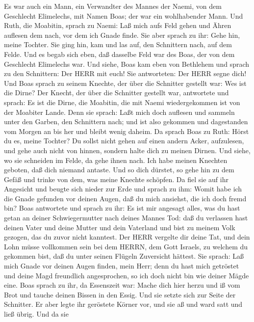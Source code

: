  Es war auch ein Mann, ein Verwandter des Mannes der Naemi,
von dem Geschlecht Elimelechs, mit Namen Boas; der war ein wohlhabender
Mann.  Und Ruth, die Moabitin, sprach zu Naemi: Laß mich
aufs Feld gehen und Ähren auflesen dem nach, vor dem ich Gnade finde.
Sie aber sprach zu ihr: Gehe hin, meine Tochter.  Sie ging
hin, kam und las auf, den Schnittern nach, auf dem Felde. Und es begab
sich eben, daß dasselbe Feld war des Boas, der von dem Geschlecht
Elimelechs war.  Und siehe, Boas kam eben von Bethlehem und
sprach zu den Schnittern: Der HERR mit euch! Sie antworteten: Der HERR
segne dich!  Und Boas sprach zu seinem Knechte, der über die
Schnitter gestellt war: Wes ist die Dirne?  Der Knecht, der
über die Schnitter gestellt war, antwortete und sprach: Es ist die
Dirne, die Moabitin, die mit Naemi wiedergekommen ist von der Moabiter
Lande.  Denn sie sprach: Laßt mich doch auflesen und sammeln
unter den Garben, den Schnittern nach; und ist also gekommen und
dagestanden vom Morgen an bis her und bleibt wenig daheim. 
Da sprach Boas zu Ruth: Hörst du es, meine Tochter? Du sollst nicht
gehen auf einen andern Acker, aufzulesen, und gehe auch nicht von
hinnen, sondern halte dich zu meinen Dirnen.  Und siehe, wo
sie schneiden im Felde, da gehe ihnen nach. Ich habe meinen Knechten
geboten, daß dich niemand antaste. Und so dich dürstet, so gehe hin zu
dem Gefäß und trinke von dem, was meine Knechte schöpfen. 
Da fiel sie auf ihr Angesicht und beugte sich nieder zur Erde und sprach
zu ihm: Womit habe ich die Gnade gefunden vor deinen Augen, daß du mich
ansiehst, die ich doch fremd bin?  Boas antwortete und
sprach zu ihr: Es ist mir angesagt alles, was du hast getan an deiner
Schwiegermutter nach deines Mannes Tod: daß du verlassen hast deinen
Vater und deine Mutter und dein Vaterland und bist zu meinem Volk
gezogen, das du zuvor nicht kanntest.  Der HERR vergelte
dir deine Tat, und dein Lohn müsse vollkommen sein bei dem HERRN, dem
Gott Israels, zu welchem du gekommen bist, daß du unter seinen Flügeln
Zuversicht hättest.  Sie sprach: Laß mich Gnade vor deinen
Augen finden, mein Herr; denn du hast mich getröstet und deine Magd
freundlich angesprochen, so ich doch nicht bin wie deiner Mägde eine.
 Boas sprach zu ihr, da Essenszeit war: Mache dich hier
herzu und iß vom Brot und tauche deinen Bissen in den Essig. Und sie
setzte sich zur Seite der Schnitter. Er aber legte ihr geröstete Körner
vor, und sie aß und ward satt und ließ übrig.  Und da sie

